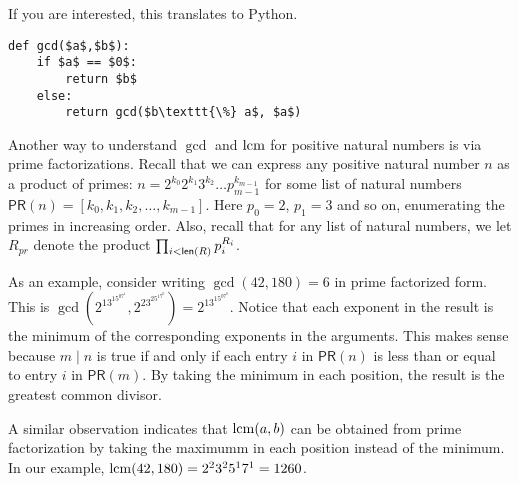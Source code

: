 If you are interested, this translates to Python.
\begin{code}
\begin{lstlisting}
def gcd($a$,$b$):
    if $a$ == $0$:
        return $b$
    else:
        return gcd($b\texttt{\%} a$, $a$)
\end{lstlisting}
\end{code}

Another way to understand $\gcd$ and $\operatorname{lcm}$ for positive natural numbers is via prime factorizations. 
Recall that we can express any positive natural number $n$ as a product of primes: 
$n = 2^{k_0}2^{k_1}3^{k_2}\dots p_{m-1}^{k_{m-1}}$ for some list of natural numbers $\mathord{\textsf{PR}}(n) = [k_0,k_1,k_2,\dots,k_{m-1}]$. Here $p_0=2$, $p_1=3$ and so on, enumerating the primes in increasing order. Also, recall that for any list of natural numbers, we let $R_{pr}$ denote
the product $\prod_{i<\mathord{\textsf{len}}(R)} p_i^{R_i}$. 

As an example, consider writing $\gcd(42,180)=6$ in prime factorized form. 
This is $\gcd(2^13^15^07^1, 2^23^25^17^0) = 2^13^15^07^0$. 
Notice that each exponent in the result is the minimum of the corresponding exponents in the arguments. 
This makes sense because $m\mid n$ is true if and only if each entry $i$ in $\mathord{\textsf{PR}}(n)$ is less than or equal to entry $i$ in $\mathord{\textsf{PR}}(m)$.
By taking the minimum in each position, the result is the greatest common divisor.

A similar observation indicates that $\operatorname{lcm}(a,b)$ can be obtained from prime factorization by taking the maximumm in each position instead of the minimum. In our example,
$\operatorname{lcm}(42,180) = 2^23^25^17^1 = 1260$.

